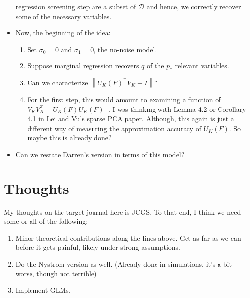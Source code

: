 \documentclass[11pt]{article}
\newcommand{\norm}[1]{\left\lVert #1 \right\rVert}
\begin{document}
\begin{itemize}
  regression screening step are a subset of $\mathcal{D}$ and hence,
  we correctly recover some of the necessary variables.
\item Now, the beginning of the idea:
\begin{enumerate}
\item Set $\sigma_0=0$ and $\sigma_1=0$, the no-noise model.
\item Suppose marginal regression recovers $q$ of the $p_*$ relevant
  variables.
\item Can we characterize $\norm{U_K(F)^\top V_K - I}$?
\item For the first step, this would amount to examining a function of
  $V_KV_K^\top-U_K(F)U_K(F)^\top$. I was thinking with Lemma 4.2 or
  Corollary 4.1 in Lei and Vu's sparse PCA paper. Although, this again
  is just a different way of measuring the approximation accuracy of
  $U_K(F)$. So maybe this is already done?
\end{enumerate}
\item Can we restate Darren's version in terms of this model?
\end{itemize}

\section{Thoughts}
My thoughts on the target journal here is JCGS. To that end, I
think we need some or all of the following:
\begin{enumerate}
\item Minor theoretical contributions along the lines above. Get as
  far as we can before it gets painful, likely under strong assumptions.
\item Do the Nystrom version as well. (Already done in simulations,
  it's a bit worse, though not terrible)
\item Implement GLMs.
\end{enumerate}







\end{document}
